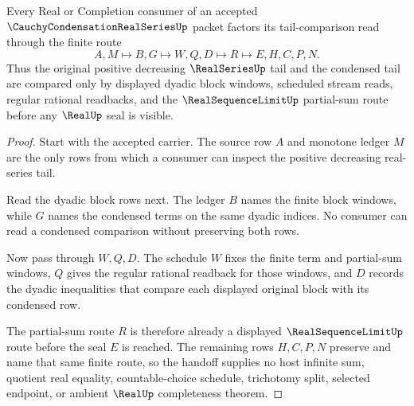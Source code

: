 \begin{theorem}
\label{thm:cauchy-condensation-real-series-cauchy-route}
Every Real or Completion consumer of an accepted $\CauchyCondensationRealSeriesUp$ packet factors its tail-comparison read through the finite route
$$
A,M\longmapsto B,G\longmapsto W,Q,D\longmapsto R\longmapsto E,H,C,P,N .
$$
Thus the original positive decreasing $\RealSeriesUp$ tail and the condensed tail are compared only by displayed dyadic block windows, scheduled stream reads, regular rational readbacks, and the $\RealSequenceLimitUp$ partial-sum route before any $\RealUp$ seal is visible.
\end{theorem}
\begin{proof}
Start with the accepted carrier. The source row $A$ and monotone ledger $M$ are the only rows from which a consumer can inspect the positive decreasing real-series tail.

Read the dyadic block rows next. The ledger $B$ names the finite block windows, while $G$ names the condensed terms on the same dyadic indices. No consumer can read a condensed comparison without preserving both rows.

Now pass through $W,Q,D$. The schedule $W$ fixes the finite term and partial-sum windows, $Q$ gives the regular rational readback for those windows, and $D$ records the dyadic inequalities that compare each displayed original block with its condensed row.

The partial-sum route $R$ is therefore already a displayed $\RealSequenceLimitUp$ route before the seal $E$ is reached. The remaining rows $H,C,P,N$ preserve and name that same finite route, so the handoff supplies no host infinite sum, quotient real equality, countable-choice schedule, trichotomy split, selected endpoint, or ambient $\RealUp$ completeness theorem.
\end{proof}


